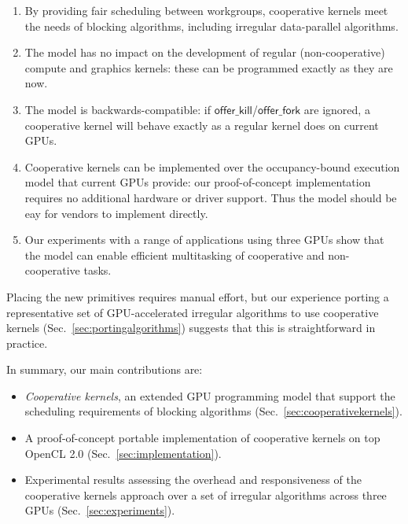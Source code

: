 \documentclass[numbers,nocopyrightspace,10pt]{sigplanconf}
\newcommand{\mysec}{Sec.~}
\newcommand{\offerfork}{\mathsf{offer\_fork}}
\newcommand{\offerkill}{\mathsf{offer\_kill}}
\begin{document}
\vspace{-1mm}
\begin{enumerate}

\item By providing fair scheduling between workgroups, cooperative
  kernels meet the needs of blocking algorithms, including irregular
  data-parallel algorithms.

\item The model has no impact on the development of regular
  (non-cooperative) compute and graphics kernels: these can be programmed exactly as they
  are now.

\item The model is backwards-compatible: if $\offerkill$/$\offerfork$ are ignored, a cooperative kernel will behave
  exactly as a regular kernel does on current GPUs.

\item Cooperative kernels can be implemented over the occupancy-bound
  execution model that current GPUs provide: our proof-of-concept implementation requires
  no additional hardware or driver support.  Thus the model should be eay for vendors to implement directly.

\item Our experiments with a range of applications using three GPUs show that the model can enable efficient multitasking of cooperative and non-cooperative
  tasks.

\end{enumerate}
\vspace{-1mm}

Placing the new primitives requires manual effort, but our experience porting a representative set of
GPU-accelerated irregular algorithms to use cooperative kernels
(\mysec\ref{sec:portingalgorithms}) suggests that this is straightforward in practice.

In summary, our main contributions are:

\vspace{-1mm}
\begin{itemize}

\item \emph{Cooperative kernels}, an extended GPU programming model that support the scheduling requirements of blocking algorithms (\mysec\ref{sec:cooperativekernels}). 

\item A proof-of-concept portable implementation of cooperative
  kernels on top OpenCL 2.0
  (\mysec\ref{sec:implementation}).

\item Experimental results assessing the overhead and responsiveness of the cooperative kernels approach over a set of irregular algorithms across three GPUs (\mysec\ref{sec:experiments}).

\end{itemize}
\vspace{-1mm}
\end{document}
